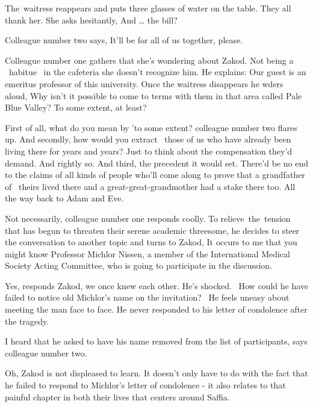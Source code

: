 \documentclass[12pt]{book}
\begin{document}
The~waitress reappears and puts three glasses of water on the table. They all thank her. She asks hesitantly,
{\textquotedbl}And {\dots} the bill?{\textquotedbl}

Colleague number two says, {\textquotedbl}It'll be for all of us together, please.{\textquotedbl}

Colleague number one gathers that she's wondering about Zakod. Not being a \ habitue \ in the cafeteria she doesn't
recognize him. He explains: {\textquotedbl}Our guest is an emeritus professor of this university.{\textquotedbl} Once
the waitress disappears he wders aloud, {\textquotedbl}Why isn't it possible to come to terms with them in that area
called Pale Blue Valley? To some extent, at least?{\textquotedbl}

{\textquotedbl}First of all, what do you mean by 'to some extent?{\textquotedbl} colleague number two flares up.
{\textquotedbl}And secondly, how would you extract \ those of us who have already been living there for years and
years? Just to think about the compensation they'd demand. And rightly so. And third, the precedent it would set.
There'd be no end to the claims of all kinds of people who'll come along to prove that a grandfather of \ theirs lived
there and a great-great-grandmother had a stake there too. All the way back to Adam and Eve.{\textquotedbl}

{\textquotedbl}Not necessarily,{\textquotedbl} colleague number one responds coolly. To relieve~the~tension that has
begun to threaten their serene academic threesome, he decides to steer the conversation to another topic and turns to
Zakod, {\textquotedbl}It occurs to me that you might know Professor Michlor Nissen, a member of the International
Medical Society Acting Committee, who is going to participate in the discussion.{\textquotedbl}

{\textquotedbl}Yes,{\textquotedbl} responds Zakod, {\textquotedbl}we once knew each other.{\textquotedbl} He's shocked.
~How could he have failed to notice old Michlor's name on the invitation? ~He feels uneasy about meeting the man face
to face. He never responded to his letter of condolence after the tragedy.

{\textquotedbl}I heard that he asked to have his name removed from the list of participants,{\textquotedbl} says
colleague number two.

{\textquotedbl}Oh,{\textquotedbl} Zakod is not displeased to learn. It doesn't only have to do with the fact that he
failed to respond to Michlor's letter of condolence - it also relates to that painful chapter in both their lives that
centers around Saffia.
\end{document}
